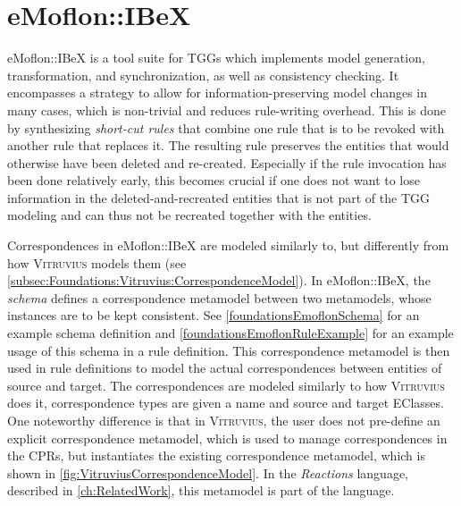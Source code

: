 
\section{eMoflon::IBeX}
\label{sec:Foundations:eMoflon}
eMoflon::IBeX \cite{eMoflonIBeX_weidmann_incremental_nodate} is a tool suite for TGGs which implements model generation, transformation, and synchronization, as well as consistency checking.
It encompasses a strategy to allow for information-preserving model changes in many cases, which is non-trivial and reduces rule-writing overhead. This is done by synthesizing \emph{short-cut rules} \cite{fritsche_short-cut-rules-repair-tgg_2021, fritsche_higher_order_short_cut_rules_2023} that combine one rule that is to be revoked with another rule that replaces it. The resulting rule preserves the entities that would otherwise have been deleted and re-created. Especially if the rule invocation has been done relatively early, this becomes crucial if one does not want to lose information in the deleted-and-recreated entities that is not part of the TGG modeling and can thus not be recreated together with the entities.

Correspondences in eMoflon::IBeX are modeled similarly to, but differently from how \textsc{Vitruvius} \cite{VitruviusKlare2021} models them (see \autoref{subsec:Foundations:Vitruvius:CorrespondenceModel}).
In eMoflon::IBeX, the \emph{schema} defines a correspondence metamodel between two metamodels, whose instances are to be kept consistent.
See \autoref{foundationsEmoflonSchema} for an example schema definition and \autoref{foundationsEmoflonRuleExample} for an example usage of this schema in a rule definition.
This correspondence metamodel is then used in rule definitions to model the actual correspondences between entities of source and target.
The correspondences are modeled similarly to how \textsc{Vitruvius} does it, correspondence types are given a name and source and target EClasses. One noteworthy difference is that in \textsc{Vitruvius}, the user does not pre-define an explicit correspondence metamodel, which is used to manage correspondences in the CPRs, but instantiates the existing correspondence metamodel, which is shown in \autoref{fig:VitruviusCorrespondenceModel}. In the \emph{Reactions} language, described in \autoref{ch:RelatedWork}, this metamodel is part of the language.


